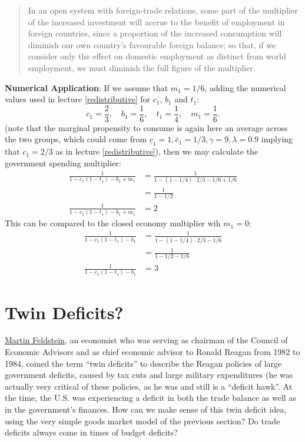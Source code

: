 \documentclass[]{book}
\theoremstyle{definition}
\theoremstyle{definition}
\theoremstyle{definition}
\theoremstyle{remark}
\begin{document}
\begin{quote}
In an open system with foreign-trade relations, some part of the
multiplier of the increased investment will accrue to the benefit of
employment in foreign countries, since a proportion of the increased
consumption will diminish our own country's favourable foreign balance;
so that, if we consider only the effect on domestic employment as
distinct from world employment, we must diminish the full figure of the
multiplier.
\end{quote}

\textbf{Numerical Application}: If we assume that \(m_1=1/6\), adding
the numerical values used in lecture \ref{redistributive} for \(c_1\),
\(b_1\) and \(t_1\):
\[c_1 = \frac{2}{3},\quad b_1=\frac{1}{6}, \quad t_1=\frac{1}{4}, \quad m_1=\frac{1}{6}.\]
(note that the marginal propensity to consume is again here an average
across the two groups, which could come from
\(\underline{c}_{1}=1, \bar{c}_{1}=1/3, \gamma=9, \lambda=0.9\) implying
that \(c_1=2/3\) as in lecture \ref{redistributive}), then we may
calculate the government spending multiplier: \[
\begin{aligned}
\frac{1}{1-c_1(1-t_1)-b_1+m_1}&=\frac{1}{1-(1-1/4) \cdot 2/3-1/6 +1/6}\\
&= \frac{1}{1-1/2}\\
\frac{1}{1-c_1(1-t_1)-b_1+m_1}&=2
\end{aligned}
\] This can be compared to the closed economy multiplier wih \(m_1=0\):
\[
\begin{aligned}
\frac{1}{1-c_1(1-t_1)-b_1}&=\frac{1}{1-(1-1/4) \cdot 2/3-1/6}\\
&= \frac{1}{1-1/2-1/6}\\
\frac{1}{1-c_1(1-t_1)-b_1}&=3
\end{aligned}
\]

\section{Twin Deficits?}\label{twin-deficits}

\href{https://en.wikipedia.org/wiki/Martin_Feldstein}{Martin Feldstein},
an economist who was serving as chairman of the Council of Economic
Advisors and as chief economic advisor to Ronald Reagan from 1982 to
1984, coined the term ``twin deficits'' to describe the Reagan policies
of large government deficits, caused by tax cuts and large military
expenditures (he was actually very critical of these policies, as he was
and still is a ``deficit hawk''. At the time, the U.S. was experiencing
a deficit in both the trade balance as well as in the government's
finances. How can we make sense of this twin deficit idea, using the
very simple goods market model of the previous section? Do trade
deficits always come in times of budget deficits?
\end{document}
